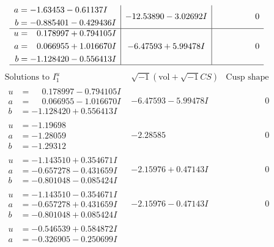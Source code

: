 \documentclass[1p]{elsarticle_modified}
\theoremstyle{definition}
\newcommand{\I}{\sqrt{-1}}
\begin{document}
$$\begin{array}{c|c|c}
\begin{aligned}
a &= -1.63453 - 0.61137 I \\
b &= -0.885401 - 0.429436 I\end{aligned}
 & -12.53890 - 3.02692 I & \phantom{-0.000000 } 0 \\ \hline\begin{aligned}
u &= \phantom{-}0.178997 + 0.794105 I \\
a &= \phantom{-}0.066955 + 1.016670 I \\
b &= -1.128420 - 0.556413 I\end{aligned}
 & -6.47593 + 5.99478 I & \phantom{-0.000000 } 0\\
 \hline 
 \end{array}$$\newpage$$\begin{array}{c|c|c}  
\text{Solutions to }I^u_{1}& \I (\text{vol} + \sqrt{-1}CS) & \text{Cusp shape}\\
 \hline 
\begin{aligned}
u &= \phantom{-}0.178997 - 0.794105 I \\
a &= \phantom{-}0.066955 - 1.016670 I \\
b &= -1.128420 + 0.556413 I\end{aligned}
 & -6.47593 - 5.99478 I & \phantom{-0.000000 } 0 \\ \hline\begin{aligned}
u &= -1.19698\phantom{ +0.000000I} \\
a &= -1.28059\phantom{ +0.000000I} \\
b &= -1.29312\phantom{ +0.000000I}\end{aligned}
 & -2.28585\phantom{ +0.000000I} & \phantom{-0.000000 } 0 \\ \hline\begin{aligned}
u &= -1.143510 + 0.354671 I \\
a &= -0.657278 - 0.431659 I \\
b &= -0.801048 - 0.085424 I\end{aligned}
 & -2.15976 + 0.47143 I & \phantom{-0.000000 } 0 \\ \hline\begin{aligned}
u &= -1.143510 - 0.354671 I \\
a &= -0.657278 + 0.431659 I \\
b &= -0.801048 + 0.085424 I\end{aligned}
 & -2.15976 - 0.47143 I & \phantom{-0.000000 } 0 \\ \hline\begin{aligned}
u &= -0.546539 + 0.584872 I \\
a &= -0.326905 - 0.250699 I \\

\end{aligned}
\end{array}$$
\end{document}
